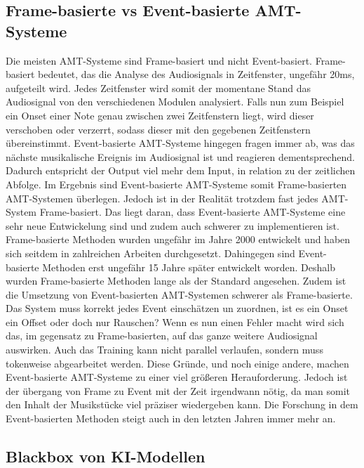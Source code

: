 \subsection{Frame-basierte vs Event-basierte AMT-Systeme}
Die meisten AMT-Systeme sind Frame-basiert und nicht Event-basiert.
Frame-basiert bedeutet, das die Analyse des Audiosignals in Zeitfenster, ungefähr 20ms, aufgeteilt wird.
Jedes Zeitfenster wird somit der momentane Stand das Audiosignal von den verschiedenen Modulen analysiert.
Falls nun zum Beispiel ein Onset einer Note genau zwischen zwei Zeitfenstern liegt,
wird dieser verschoben oder verzerrt, sodass dieser mit den gegebenen Zeitfenstern übereinstimmt.
Event-basierte AMT-Systeme hingegen fragen immer ab,
was das nächste musikalische Ereignis im Audiosignal ist und reagieren dementsprechend.
Dadurch entspricht der Output viel mehr dem Input, in relation zu der zeitlichen Abfolge.
Im Ergebnis sind Event-basierte AMT-Systeme somit Frame-basierten AMT-Systemen überlegen.
Jedoch ist in der Realität trotzdem fast jedes AMT-System Frame-basiert.
Das liegt daran, dass Event-basierte AMT-Systeme eine sehr neue Entwickelung sind
und zudem auch schwerer zu implementieren ist.
Frame-basierte Methoden wurden ungefähr im Jahre 2000 entwickelt
und haben sich seitdem in zahlreichen Arbeiten durchgesetzt.
\cite{Martin1996, klapuri1998automatic}
Dahingegen sind Event-basierte Methoden erst ungefähr 15 Jahre später entwickelt worden.
\cite{performance_rnn2017event}
Deshalb wurden Frame-basierte Methoden lange als der Standard angesehen.
Zudem ist die Umsetzung von Event-basierten AMT-Systemen schwerer als Frame-basierte.
Das System muss korrekt jedes Event einschätzen un zuordnen, ist es ein Onset ein Offset oder doch nur Rauschen?
Wenn es nun einen Fehler macht wird sich das, 
im gegensatz zu Frame-basierten, auf das ganze weitere Audiosignal auswirken.
Auch das Training kann nicht parallel verlaufen, sondern muss tokenweise abgearbeitet werden.
Diese Gründe, und noch einige andere, machen Event-basierte AMT-Systeme zu einer viel größeren Herauforderung.
Jedoch ist der übergang von Frame zu Event mit der Zeit irgendwann nötig, da man somit den Inhalt der Musikstücke
viel präziser wiedergeben kann.
Die Forschung in dem Event-basierten Methoden steigt auch in den letzten Jahren immer mehr an.

\subsection{Blackbox von KI-Modellen}


